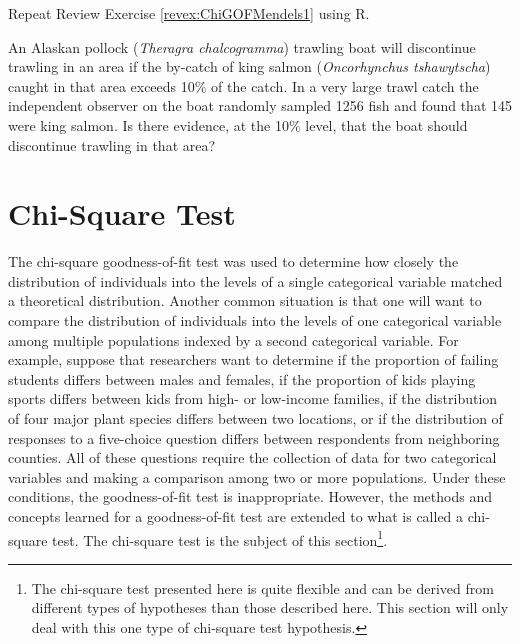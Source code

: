 \documentclass[10pt,openany]{book}\usepackage[]{graphicx}\usepackage[]{color}
\begin{document}
\begin{exsection}
  \item \label{revex:ChiGOFMendels1R} \rhw{} Repeat Review Exercise \ref{revex:ChiGOFMendels1} using R. 

  \item \label{revex:ChiGOFByCatch} \rhw{} An Alaskan pollock (\textit{Theragra chalcogramma}) trawling boat will discontinue trawling in an area if the by-catch of king salmon (\textit{Oncorhynchus tshawytscha}) caught in that area exceeds 10\% of the catch.  In a very large trawl catch the independent observer on the boat randomly sampled 1256 fish and found that 145 were king salmon.  Is there evidence, at the 10\% level, that the boat should discontinue trawling in that area? 
\end{exsection}

\section{Chi-Square Test}
The chi-square goodness-of-fit test was used to determine how closely the distribution of individuals into the levels of a single categorical variable matched a theoretical distribution.  Another common situation is that one will want to compare the distribution of individuals into the levels of one categorical variable among multiple populations indexed by a second categorical variable.  For example, suppose that researchers want to determine if the proportion of failing students differs between males and females, if the proportion of kids playing sports differs between kids from high- or low-income families, if the distribution of four major plant species differs between two locations, or if the distribution of responses to a five-choice question differs between respondents from neighboring counties.  All of these questions require the collection of data for two categorical variables and making a comparison among two or more populations.  Under these conditions, the goodness-of-fit test is inappropriate.  However, the methods and concepts learned for a goodness-of-fit test are extended to what is called a chi-square test.  The chi-square test is the subject of this section\footnote{The chi-square test presented here is quite flexible and can be derived from different types of hypotheses than those described here.  This section will only deal with this one type of chi-square test hypothesis.}.

\end{document}
